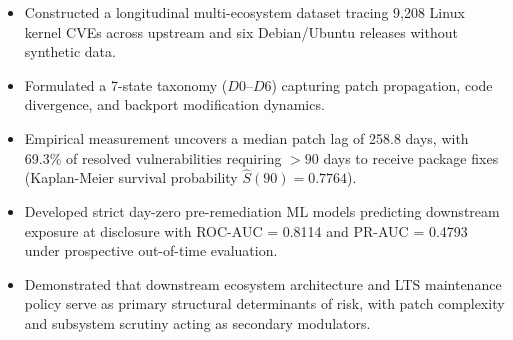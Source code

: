 \begin{itemize}
    \item Constructed a longitudinal multi-ecosystem dataset tracing 9,208 Linux kernel CVEs across upstream and six Debian/Ubuntu releases without synthetic data.
    \item Formulated a 7-state taxonomy ($D0$--$D6$) capturing patch propagation, code divergence, and backport modification dynamics.
    \item Empirical measurement uncovers a median patch lag of 258.8 days, with 69.3\% of resolved vulnerabilities requiring $>90$ days to receive package fixes (Kaplan-Meier survival probability $\hat{S}(90) = 0.7764$).
    \item Developed strict day-zero pre-remediation ML models predicting downstream exposure at disclosure with ROC-AUC = 0.8114 and PR-AUC = 0.4793 under prospective out-of-time evaluation.
    \item Demonstrated that downstream ecosystem architecture and LTS maintenance policy serve as primary structural determinants of risk, with patch complexity and subsystem scrutiny acting as secondary modulators.
\end{itemize}
